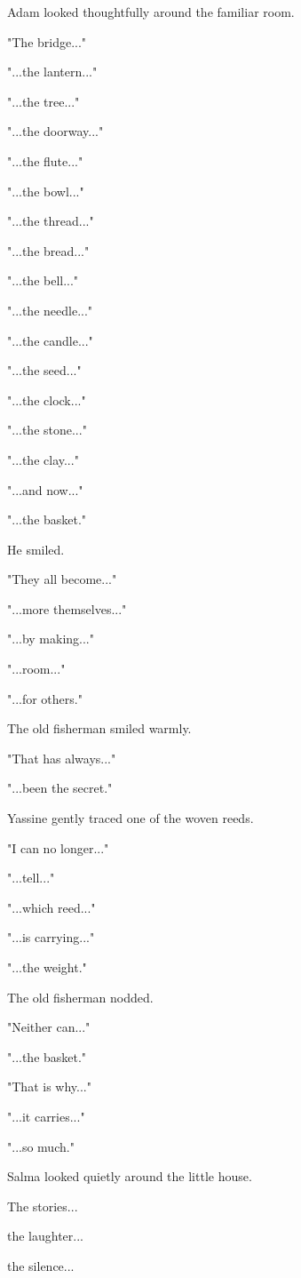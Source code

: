 \documentclass[12pt,openany]{book}
\begin{document}
Adam looked thoughtfully around the familiar room.

"The bridge..."

"...the lantern..."

"...the tree..."

"...the doorway..."

"...the flute..."

"...the bowl..."

"...the thread..."

"...the bread..."

"...the bell..."

"...the needle..."

"...the candle..."

"...the seed..."

"...the clock..."

"...the stone..."

"...the clay..."

"...and now..."

"...the basket."

He smiled.

"They all become..."

"...more themselves..."

"...by making..."

"...room..."

"...for others."

The old fisherman smiled warmly.

"That has always..."

"...been the secret."

Yassine gently traced one of the woven reeds.

"I can no longer..."

"...tell..."

"...which reed..."

"...is carrying..."

"...the weight."

The old fisherman nodded.

"Neither can..."

"...the basket."

"That is why..."

"...it carries..."

"...so much."

Salma looked quietly around the little house.

The stories...

the laughter...

the silence...
\end{document}
